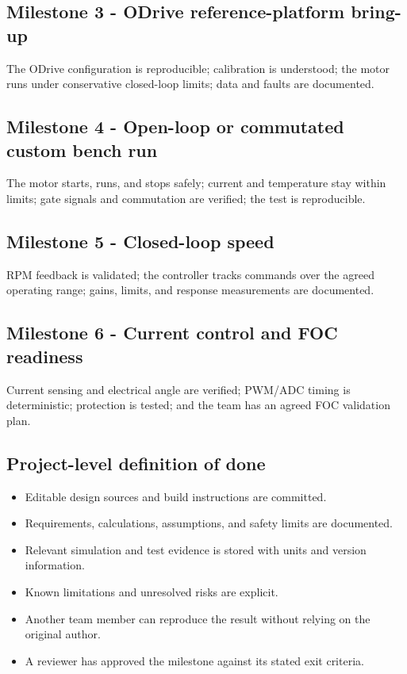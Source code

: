 \documentclass[11pt,a4paper]{article}
\begin{document}
\subsection{Milestone 3 - ODrive reference-platform bring-up}
The ODrive configuration is reproducible; calibration is understood; the
motor runs under conservative closed-loop limits; data and faults are
documented.

\subsection{Milestone 4 - Open-loop or commutated custom bench run}
The motor starts, runs, and stops safely; current and temperature stay within
limits; gate signals and commutation are verified; the test is reproducible.

\subsection{Milestone 5 - Closed-loop speed}
RPM feedback is validated; the controller tracks commands over the agreed
operating range; gains, limits, and response measurements are documented.

\subsection{Milestone 6 - Current control and FOC readiness}
Current sensing and electrical angle are verified; PWM/ADC timing is
deterministic; protection is tested; and the team has an agreed FOC
validation plan.

\subsection{Project-level definition of done}
\begin{itemize}
  \item Editable design sources and build instructions are committed.
  \item Requirements, calculations, assumptions, and safety limits are documented.
  \item Relevant simulation and test evidence is stored with units and version information.
  \item Known limitations and unresolved risks are explicit.
  \item Another team member can reproduce the result without relying on the original author.
  \item A reviewer has approved the milestone against its stated exit criteria.
\end{itemize}
\end{document}

